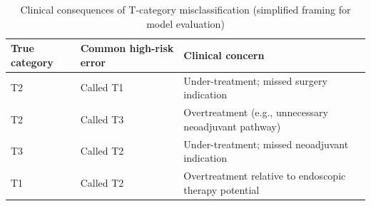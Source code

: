\begin{table}[htbp]
\centering
\caption{Clinical consequences of T-category misclassification (simplified framing for model evaluation)}
\label{tab:clinical_harm}
\begin{tabular}{p{2.2cm}p{4.8cm}p{5.5cm}}
\toprule
True category & Common high-risk error & Clinical concern \\
\midrule
T2 & Called T1 & Under-treatment; missed surgery indication \\
T2 & Called T3 & Overtreatment (e.g., unnecessary neoadjuvant pathway) \\
T3 & Called T2 & Under-treatment; missed neoadjuvant indication \\
T1 & Called T2 & Overtreatment relative to endoscopic therapy potential \\
\bottomrule
\end{tabular}
\end{table}
